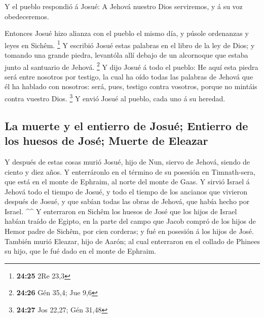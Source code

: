  Y el pueblo respondió á Josué: A Jehová nuestro Dios
serviremos, y á su voz obedeceremos.

 Entonces Josué hizo alianza con el pueblo el mismo día, y
púsole ordenanzas y leyes en Sichêm. \footnote{\textbf{24:25} 2Re 23,3}
 Y escribió Josué estas palabras en el libro de la ley de
Dios; y tomando una grande piedra, levantóla allí debajo de un
alcornoque que estaba junto al santuario de Jehová. \footnote{\textbf{24:26}
  Gén 35,4; Jue 9,6}  Y dijo Josué á todo el pueblo: He
aquí esta piedra será entre nosotros por testigo, la cual ha oído todas
las palabras de Jehová que él ha hablado con nosotros: será, pues,
testigo contra vosotros, porque no mintáis contra vuestro Dios.
\footnote{\textbf{24:27} Jos 22,27; Gén 31,48}  Y envió
Josué al pueblo, cada uno á su heredad.

\hypertarget{la-muerte-y-el-entierro-de-josuuxe9-entierro-de-los-huesos-de-josuxe9-muerte-de-eleazar}{%
\subsection{La muerte y el entierro de Josué; Entierro de los huesos de
José; Muerte de
Eleazar}\label{la-muerte-y-el-entierro-de-josuuxe9-entierro-de-los-huesos-de-josuxe9-muerte-de-eleazar}}

 Y después de estas cosas murió Josué, hijo de Nun, siervo
de Jehová, siendo de ciento y diez años.  Y enterráronlo en
el término de su posesión en Timnath-sera, que está en el monte de
Ephraim, al norte del monte de Gaas.  Y sirvió Israel á
Jehová todo el tiempo de Josué, y todo el tiempo de los ancianos que
vivieron después de Josué, y que sabían todas las obras de Jehová, que
había hecho por Israel. \^{}\^{}  Y enterraron en Sichêm
los huesos de José que los hijos de Israel habían traído de Egipto, en
la parte del campo que Jacob compró de los hijos de Hemor padre de
Sichêm, por cien corderas; y fué en posesión á los hijos de José.
 También murió Eleazar, hijo de Aarón; al cual enterraron
en el collado de Phinees su hijo, que le fué dado en el monte de
Ephraim.
